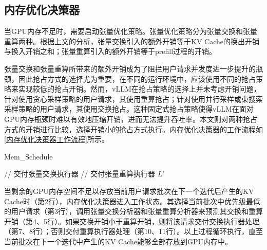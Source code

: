 \documentclass[a4paper, nosysfonts]{hpcchina}
\begin{document}
\subsection{内存优化决策器}
当GPU内存不足时，需要启动张量优化策略。张量优化策略分为张量交换和张量重算两种。根据上文的分析，张量交换引入的额外开销等于KV Cache的换出开销与换入开销之和；张量重算引入的额外开销等于prefill过程的开销。 \par
张量交换和张量重算所带来的额外开销成为了阻拦用户请求并发度进一步提升的瓶颈，因此抢占方式的选择尤为重要，在不同的运行环境中，应该使用不同的抢占策略来实现较低的抢占开销。然而，vLLM在抢占策略的选择上并未考虑开销问题，针对使用贪心采样策略的用户请求，其使用重算抢占；针对使用并行采样或束搜索采样策略的用户请求，其使用交换抢占。这种固定式抢占策略使得vLLM在面对GPU内存瓶颈时难以有效地压缩开销，进而无法提升吞吐率。本文则对两种抢占方式的开销进行比较，选择开销小的抢占方式执行。内存优化决策器的工作流程如\ref{内存优化决策器工作流程}所示。
\begin{algorithm}
  \caption{Mem\_Schedule}
  \label{内存优化决策器工作流程}
  \begin{spacing}{1.2}
    \begin{algorithmic}[1]
           \hfill {// 交付张量交换执行器}
        \ELSE
           \hfill {// 交付张量重算执行器}
        \ENDIF
      \ENDWHILE
      \RETURN $L'$
    \end{algorithmic}
  \end{spacing}
\end{algorithm}
当剩余的GPU内存空间不足以存放当前用户请求批次在下一个迭代后产生的KV Cache时（第2行），内存优化决策器进入工作状态。其选择当前批次中优先级最低的用户请求（第3行），调用张量交换分析器和张量重算分析器来预测其交换和重算开销（第4、5行）。如果交换开销小于重算开销，则将该请求交付交换执行器处理（第7、8行）；否则交付重算执行器处理（第10、11行）。以上过程循环执行，直至当前批次在下一个迭代中产生的KV Cache能够全部存放到GPU内存中。
\end{document}
